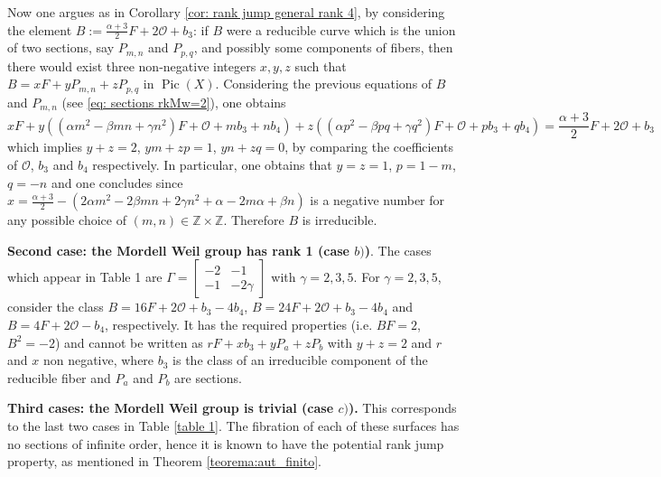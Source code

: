 \documentclass{amsart}
\theoremstyle{definition}
\numberwithin{equation}{section}
\newcommand{\Z}{\mathbb{Z}}
\renewcommand{\O}{\mathcal{O}}
\DeclareMathOperator{\Pic}{Pic}
\begin{document}
Now one argues as in Corollary \ref{cor: rank jump general rank 4}, by considering the element $B:=\frac{\alpha+3}{2}F+2\O+b_3$:
if $B$ were a reducible curve which is the union of two sections, say $P_{m,n}$ and $P_{p,q}$, and possibly some components of fibers, then there would exist three non-negative integers $x,y,z$ such that $B=xF+yP_{m,n}+zP_{p,q}$ in $\Pic(X)$. Considering the previous equations of $B$ and $P_{m,n}$ (see \eqref{eq: sections rkMw=2}), one obtains $$xF+y\left((\alpha m^2-\beta m n+\gamma n^2)F+\O+mb_3+nb_4\right)+z\left((\alpha p^2-\beta p q+\gamma q^2)F+\O+pb_3+qb_4\right)=\frac{\alpha+3}{2}F+2\O+b_3$$
which implies $y+z=2$, $ym+zp=1$, $yn+zq=0$, by comparing the coefficients of $\O$, $b_3$ and $b_4$ respectively.
In particular, one obtains that $y=z=1$, $p=1-m$, $q=-n$ and one concludes since  $x=\frac{\alpha+3}{2}-\left(2\alpha m^2-2\beta m n+2\gamma n^2+\alpha-2m\alpha+\beta n\right)$ is a negative number for any possible choice of $(m,n)\in\Z\times \Z$. Therefore $B$ is irreducible.



{\bf Second case: the Mordell Weil group has rank 1 (case $b)$)}. The cases which appear in Table 1 are $\Gamma=\left[\begin{array}{cc}-2&-1\\-1&-2\gamma\end{array}\right]$ with $\gamma=2,3,5$. For $\gamma=2,3,5$, consider the class $B=16F+2\O+b_3-4b_4$, $B=24F+2\O+b_3-4b_4$ and $B=4F+2\O-b_4$, respectively. It has the required properties (i.e. $BF=2$, $B^2=-2$) and cannot be written as $rF+xb_3+yP_{a}+zP_b$ with $y+z=2$ and $r$ and $x$ non negative, where $b_3$ is the class of an irreducible component of the reducible fiber and $P_a$ and $P_b$ are sections. 

{\bf Third cases: the Mordell Weil group is trivial (case $c)$).} This corresponds to the last two cases in Table \ref{table 1}. The fibration of each of these surfaces  has no sections of infinite order, hence it is known to have the potential rank jump property, as mentioned in Theorem \ref{teorema:aut_finito}.
\endproof
\end{document}
